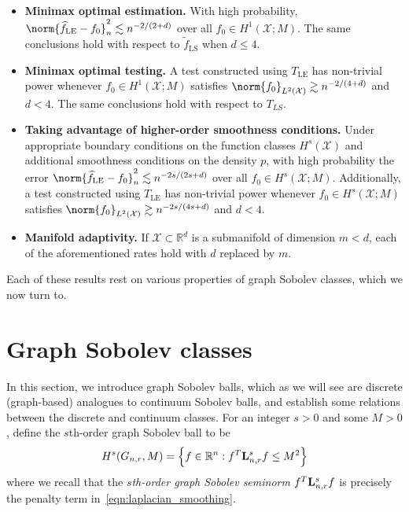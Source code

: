 \documentclass{article}
\newcommand{\Reals}{\mathbb{R}}
\newcommand{\1}{\mathbf{1}}
\newcommand{\Rd}{\Reals^d}
\newcommand{\Lap}{{\bf L}}
\newcommand{\Xset}{\mathcal{X}}
\newcommand{\Leb}{L}
\newcommand{\mc}[1]{\mathcal{#1}}
\newcommand{\wt}[1]{\widetilde{#1}}
\newcommand{\wh}[1]{\widehat{#1}}
\newcommand{\LE}{\mathrm{LE}}
\newcommand{\LS}{\mathrm{LS}}
\theoremstyle{alden}
\theoremstyle{aldenthm}
\theoremstyle{definition}
\theoremstyle{remark}
\begin{document}
\begin{itemize}
	\item \textbf{Minimax optimal estimation.} With high probability, $\norm{\wh{f}_{\LE} - f_0}_{n}^2 \lesssim n^{-2/(2 + d)}$ over all $f_0 \in H^1(\Xset;M)$. The same conclusions hold with respect to $\wt{f}_{\LS}$ when $d \leq 4$. 
	\item \textbf{Minimax optimal testing.}
	A test constructed using $T_{\LE}$ has non-trivial power whenever $f_0 \in H^1(\Xset;M)$ satisfies $\norm{f_0}_{\Leb^2(\Xset)} \gtrsim n^{-2/(4 + d)}$ and $d < 4$. The same conclusions hold with respect to $T_{LS}$.
	\item \textbf{Taking advantage of higher-order smoothness conditions.} Under appropriate boundary conditions on the function classes $H^s(\Xset)$ and additional smoothness conditions on the density $p$, with high probability the error $\norm{\wh{f}_{\LE} - f_0}_{n}^2 \lesssim n^{-2s/(2s + d)}$ over all $f_0 \in H^s(\Xset;M)$. Additionally, a test constructed using $T_{\LE}$ has non-trivial power whenever $f_0 \in H^s(\Xset;M)$ satisfies $\norm{f_0}_{\Leb^2(\Xset)} \gtrsim n^{-2s/(4s + d)}$ and $d < 4$.
	\item \textbf{Manifold adaptivity.}
	If $\mc{X} \subset \Rd$ is a submanifold of dimension $m < d$, each of the aforementioned rates hold with $d$ replaced by $m$.
\end{itemize}

Each of these results rest on various properties of graph Sobolev classes, which we now turn to.

\section{Graph Sobolev classes}
\label{sec:graph_sobolev_classes}
In this section, we introduce graph Sobolev balls, which as we will see are discrete (graph-based) analogues to continuum Sobolev balls, and establish some relations between the discrete and continuum classes. For an integer $s > 0$ and some $M > 0$, define the $s$th-order graph Sobolev ball to be
\begin{equation}
\label{eqn:graph_sobolev_ball}
H^s(G_{n,r},M) = \Bigl\{f \in \Reals^n: f^T \Lap_{n,r}^s f \leq M^2\Bigr\}
\end{equation}
where we recall that the \emph{$s$th-order graph Sobolev seminorm} $f^T \Lap_{{n,r}}^s f$ is precisely the penalty term in~\eqref{eqn:laplacian_smoothing}. 
\end{document}
